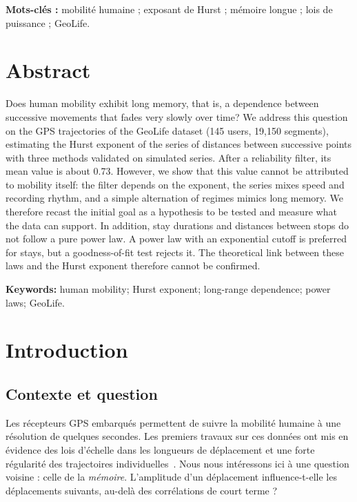 \documentclass[11pt,a4paper]{article}
\renewcommand{\_}{\textunderscore\penalty0\hspace{0pt}}
\begin{document}
\medskip
\noindent\textbf{Mots-clés :} mobilité humaine ; exposant de Hurst ; mémoire longue ; lois de
puissance ; GeoLife.

\bigskip
\section*{Abstract}

Does human mobility exhibit long memory, that is, a dependence between successive
movements that fades very slowly over time? We address this question on the GPS
trajectories of the GeoLife dataset (145 users, 19,150 segments), estimating the Hurst
exponent of the series of distances between successive points with three methods validated
on simulated series. After a reliability filter, its mean value is about 0.73. However, we
show that this value cannot be attributed to mobility itself: the filter depends on the
exponent, the series mixes speed and recording rhythm, and a simple alternation of regimes
mimics long memory. We therefore recast the initial goal as a hypothesis to be tested and
measure what the data can support. In addition, stay durations and distances between stops
do not follow a pure power law. A power law with an exponential cutoff is preferred for
stays, but a goodness-of-fit test rejects it. The theoretical link between these laws and
the Hurst exponent therefore cannot be confirmed.

\medskip
\noindent\textbf{Keywords:} human mobility; Hurst exponent; long-range dependence; power
laws; GeoLife.

\clearpage
\tableofcontents
\listoftables
\listoffigures

\clearpage
{}

\section{Introduction}
\label{sec:intro}

\subsection{Contexte et question}

Les récepteurs GPS embarqués permettent de suivre la mobilité humaine à une résolution de
quelques secondes. Les premiers travaux sur ces données ont mis en évidence des lois
d'échelle dans les longueurs de déplacement et une forte régularité des trajectoires
individuelles~\cite{brockmann2006,gonzalez2008,rhee2011}. Nous nous intéressons ici à une
question voisine : celle de la \emph{mémoire}. L'amplitude d'un déplacement influence-t-elle
les déplacements suivants, au-delà des corrélations de court terme ?
\end{document}
